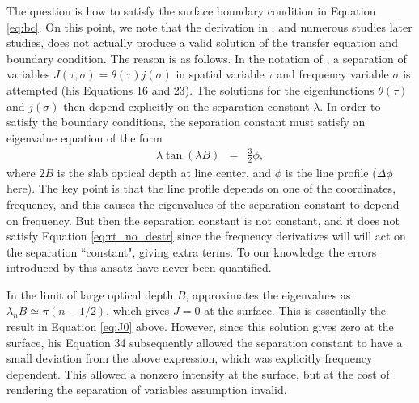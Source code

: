 \documentclass{aastex63}
\newcommand{\be}{\begin{eqnarray}}
\newcommand{\ee}{\end{eqnarray}}
\begin{document}
The question is how to satisfy the surface boundary condition in Equation \ref{eq:bc}. On this point, we note that the derivation in \citet{1973MNRAS.162...43H}, and numerous studies later studies, does not actually produce a valid solution of the transfer equation and boundary condition. The reason is as follows. In the notation of \citet{1973MNRAS.162...43H}, a separation of variables
$J(\tau,\sigma) = \theta(\tau) j(\sigma)$ in spatial variable $\tau$ and frequency variable $\sigma$ is attempted (his Equations 16 and 23). The solutions for the eigenfunctions $\theta(\tau)$ and $j(\sigma)$ then depend explicitly on the separation constant $\lambda$. In order to satisfy the boundary conditions, the separation constant must satisfy an eigenvalue equation of the form
\be
\lambda \tan(\lambda B) & = & \frac{3}{2} \phi,
\label{eq:evalue}
\ee
where $2B$ is the slab optical depth at line center, and $\phi$ is the line profile ($\Delta \phi$ here). The key point is that the line profile depends on one of the coordinates, frequency, and this causes the eigenvalues of the separation constant to depend on frequency. But then the separation constant is not constant, and it does not satisfy Equation \ref{eq:rt_no_destr} since the frequency derivatives will will act on the separation ``constant", giving extra terms. To our knowledge the errors introduced by this ansatz have never been quantified. 

In the limit of large optical depth $B$, \citealt{1973MNRAS.162...43H} approximates the eigenvalues as $\lambda_n B \simeq \pi (n-1/2)$, which gives $J=0$ at the surface. This is essentially the result in Equation \ref{eq:J0} above. However, since this solution gives zero at the surface, his Equation 34 subsequently allowed the separation constant to have a small deviation from the above expression, which was explicitly frequency dependent. This allowed a nonzero intensity at the surface, but at the cost of rendering the separation of variables assumption invalid.
\end{document}
